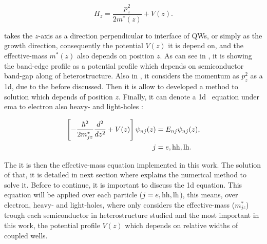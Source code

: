 \begin{equation}\label{eqn:chapter-2-sec-numerical-calculations-ema-hamiltonian}
	H_{z} = \dfrac{p_{z}^{2}}{2m^{*}(z)}+V(z).
\end{equation}

 takes the $z$-axis as a direction perpendicular to interface of QWs, or simply as the growth direction, consequently the potential $V(z)$ it is depend on, and the effective-mass $m^{*}(z)$ also depends on position $z$. As can see in , it is showing the band-edge profile as a potential profile which depends on semiconductor band-gap along of heterostructure.  Also in , it considers the momentum as $p_{z}^{2}$ as a \gls{1d}, due to the before discussed. Then it is allow to developed a method to solution which depends of position $z$. Finally, it can denote a \gls{1d} \sch\, equation under \gls{ema} to electron also heavy- and light-holes : 

\begin{equation}\label{eqn:chapter-2-sec-numerical-calculations-ema-schrodinger}
	\begin{split}
	\left[-\dfrac{\hbar^2}{2m_{jz}^{*}}\dfrac{d^2}{dz^2}+V(z) \right]\psi_{nj}(z)&= E_{nj}\psi_{nj}(z),\\
	                                                               j&=e,\mathrm{hh},\mathrm{lh}.
	\end{split}
\end{equation}

The  it is then the effective-mass equation implemented in this work. The solution of that, it is detailed in next section where explains the numerical method to solve it. Before to continue, it is important to discuss the \gls{1d} equation. This equation will be applied over each particle ($j=e,\mathrm{hh},\mathrm{lh}$), this means, over electron, heavy- and light-holes, where only considers the effective-mass ($m_{jz}^{*}$) trough each semiconductor in heterostructure studied and the most important in this work, the potential profile $V(z)$ which depends on relative widths of coupled wells. 



